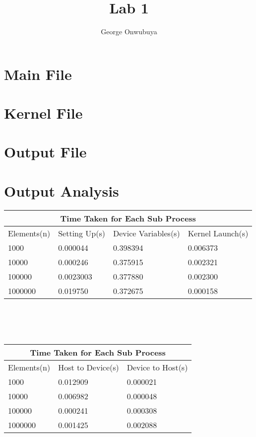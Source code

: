 \documentclass{article}
\title{Lab 1}
\author{George Onwubuya}
\begin{document}
\maketitle

\section{Main File }

\section{Kernel File }

\section{Output File }

\section{Output Analysis}


\begin{tabular}{ |p{3cm}||p{3cm}|p{3cm}|p{3cm}|  }
 \hline
 \multicolumn{4}{|c|}{Time Taken for Each Sub Process} \\
 \hline
 Elements(n) & Setting Up(s) & Device Variables(s) & Kernel Launch(s) \\
 \hline
 1000 & 0.000044 & 0.398394 & 0.006373\\
 \hline
 10000 & 0.000246 & 0.375915  & 0.002321\\
 \hline
 100000 & 0.0023003 & 0.377880 & 0.002300\\
 \hline
 1000000 & 0.019750 & 0.372675 &0.000158\\
  \hline
  \end{tabular}
  \\
  \\
  \\
  \setlength{\parindent}{1cm}
  \begin{tabular}{ |p{3cm}||p{3cm}|p{3cm}|  }
 \hline
 \multicolumn{3}{|c|}{Time Taken for Each Sub Process} \\
 \hline
 Elements(n) & Host to Device(s) & Device to Host(s)\\
 \hline
 1000 & 0.012909 & 0.000021\\
 \hline
 10000 & 0.006982 & 0.000048\\
 \hline
 100000 & 0.000241 & 0.000308\\
 \hline
 1000000 & 0.001425 &0.002088\\
  \hline
\end{tabular}
\end{document}
